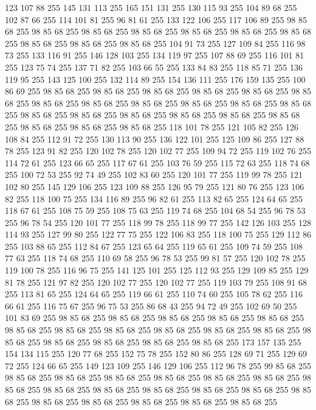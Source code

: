 123 107 88 255 145 131 113 255 165 151 131 255 130 115 93 255 104 89 68 255 102 87 66 255 114 101 81 255 96 81 61 255 133 122 106 255 117 106 89 255 98 85 68 255 98 85 68 255 98 85 68 255 98 85 68 255 98 85 68 255 98 85 68 255 98 85 68 255 98 85 68 255 98 85 68 255 98 85 68 255 104 91 73 255 127 109 84 255 116 98 73 255 133 116 91 255 146 128 103 255 134 119 97 255 107 88 69 255 116 101 81 255 123 75 74 255 137 71 82 255 103 66 55 255 133 84 83 255 118 85 71 255 136 119 95 255 143 125 100 255 132 114 89 255 154 136 111 255 176 159 135 255 100 86 69 255 98 85 68 255 98 85 68 255 98 85 68 255 98 85 68 255 98 85 68 255 98 85 68 255 98 85 68 255 98 85 68 255 98 85 68 255 98 85 68 255 98 85 68 255 98 85 68 255 98 85 68 255 98 85 68 255 98 85 68 255 98 85 68 255 98 85 68 255 98 85 68 255 98 85 68 255 98 85 68 255 98 85 68 255 118 101 78 255 121 105 82 255 126 108 84 255 112 91 72 255
130 113 90 255 136 122 101 255 125 109 86 255 127 88 78 255 123 91 82 255 120 102 78 255 120 102 77 255 109 94 72 255 119 102 76 255 114 72 61 255 123 66 65 255 117 67 61 255 103 76 59 255 115 72 63 255 118 74 68 255 100 72 53 255 92 74 49 255 102 83 60 255 120 101 77 255 119 99 78 255 121 102 80 255 145 129 106 255 123 109 88 255 126 95 79 255 121 80 76 255 123 106 82 255 118 100 75 255 134 116 89 255 96 82 61 255 113 82 65 255 124 64 65 255 118 67 61 255 108 75 59 255 108 75 63 255 119 74 68 255 104 68 54 255 96 78 53 255 96 78 54 255 120 101 77 255 118 99 78 255 118 99 77 255 142 126 103 255 128 114 93 255 127 99 80 255 122 77 75 255 122 106 83 255 118 100 75 255 129 112 86 255 103 88 65 255 112 84 67 255 123 65 64 255 119 65 61 255 109 74 59 255 108 77 63 255 118 74 68 255 110 69 58 255 96 78 53 255 99 81 57 255 120 102 78 255 119 100 78 255 116 96 75 255 141 125 101 255 125 112 93 255 129 109 85 255
129 81 78 255 121 97 82 255 120 102 77 255 120 102 77 255 119 103 79 255 108 91 68 255 113 81 65 255 124 64 65 255 119 66 61 255 110 74 60 255 105 78 62 255 116 66 61 255 116 75 67 255 96 75 53 255 86 68 43 255 94 72 49 255 102 69 50 255 101 83 69 255 98 85 68 255 98 85 68 255 98 85 68 255 98 85 68 255 98 85 68 255 98 85 68 255 98 85 68 255 98 85 68 255 98 85 68 255 98 85 68 255 98 85 68 255 98 85 68 255 98 85 68 255 98 85 68 255 98 85 68 255 98 85 68 255 173 157 135 255 154 134 115 255 120 77 68 255 152 75 78 255 152 80 86 255 128 69 71 255 129 69 72 255 124 66 65 255 149 123 109 255 146 129 106 255 112 96 78 255 99 85 68 255 98 85 68 255 98 85 68 255 98 85 68 255 98 85 68 255 98 85 68 255 98 85 68 255 98 85 68 255 98 85 68 255 98 85 68 255 98 85 68 255 98 85 68 255 98 85 68 255 98 85 68 255 98 85 68 255 98 85 68 255 98 85 68 255 98 85 68 255 98 85 68 255
